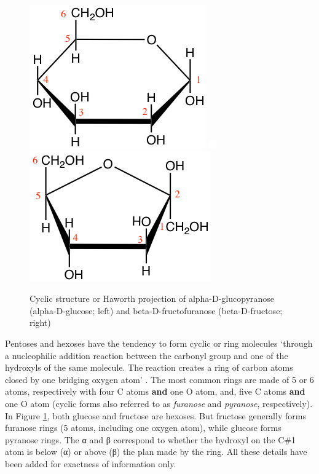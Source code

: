 \documentclass[]{book}
\theoremstyle{definition}
\theoremstyle{definition}
\theoremstyle{definition}
\theoremstyle{remark}
\begin{document}
\begin{figure}

{\centering \includegraphics[width=0.25\linewidth]{pictures/glucose-haworth} \includegraphics[width=0.25\linewidth]{pictures/blank} \includegraphics[width=0.25\linewidth]{pictures/fructose-haworth} 

}

\caption{Cyclic structure or Haworth projection of alpha-D-glucopyranose (alpha-D-glucose; left) and beta-D-fructofuranose (beta-D-fructose; right)}\label{fig:glucose-fructose}
\end{figure}

Pentoses and hexoses have the tendency to form cyclic or ring molecules
`through a nucleophilic addition reaction between the carbonyl group and
one of the hydroxyls of the same molecule. The reaction creates a ring
of carbon atoms closed by one bridging oxygen atom'
\citep{Wikipedia_contributors2018-li}. The most common rings are made of
5 or 6 atoms, respectively with four C atoms \textbf{and} one O atom,
and, five C atoms \textbf{and} one O atom (cyclic forms also referred to
as \emph{furanose} and \emph{pyranose}, respectively). In Figure
\ref{fig:glucose-fructose}, both glucose and fructose are hexoses. But
fructose generally forms furanose rings (5 atoms, including one oxygen
atom), while glucose forms pyranose rings. The α and β correspond to
whether the hydroxyl on the C\#1 atom is below (α) or above (β) the plan
made by the ring. All these details have been added for exactness of
information only.
\end{document}
